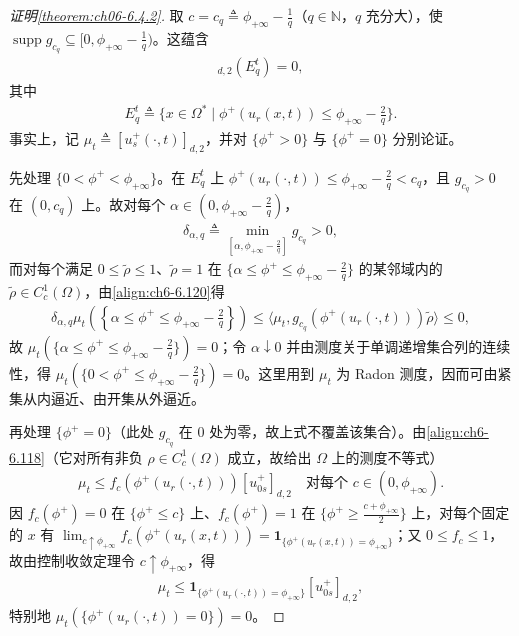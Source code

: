 \documentclass[../../main.tex]{subfiles}%
\begin{document}
\begin{proof}[证明\cref{theorem:ch06-6.4.2}]
取 $c=c_q\triangleq\phi_{+\infty}-\frac1q$（$q\in\mathbb{N}$，$q$ 充分大），使 $\operatorname{supp}g_{c_q}\subseteq[0,\phi_{+\infty}-\frac1q)$。这蕴含
\begin{align}
[u^+_s(\cdot,t)]_{d,2}(E^t_q)=0, \label{align:ch6-6.121}
\end{align}
其中
\begin{align*}
E^t_q\triangleq \{x\in\Omega^*\mid\phi^+(u_r(x,t))\leqslant\phi_{+\infty}-\frac{2}{q}\}.
\end{align*}
事实上，记 $\mu_t\triangleq[u^+_s(\cdot,t)]_{d,2}$，并对 $\{\phi^+>0\}$ 与 $\{\phi^+=0\}$ 分别论证。

先处理 $\{0<\phi^+<\phi_{+\infty}\}$。在 $E^t_q$ 上 $\phi^+(u_r(\cdot,t))\leqslant\phi_{+\infty}-\frac{2}{q}<c_q$，且 $g_{c_q}>0$ 在 $(0,c_q)$ 上。故对每个 $\alpha\in(0,\phi_{+\infty}-\frac{2}{q})$，
\begin{align*}
\delta_{\alpha,q}\triangleq\min_{[\alpha,\phi_{+\infty}-\frac{2}{q}]}g_{c_q}>0,
\end{align*}
而对每个满足 $0\leqslant\widetilde\rho\leqslant1$、$\widetilde\rho=1$ 在 $\{\alpha\leqslant\phi^+\leqslant\phi_{+\infty}-\frac{2}{q}\}$ 的某邻域内的 $\widetilde\rho\in C^1_c(\Omega)$，由\eqref{align:ch6-6.120}得
\begin{align*}
\delta_{\alpha,q}\mu_t\left(\left\{\alpha\leqslant\phi^+\leqslant\phi_{+\infty}-\tfrac{2}{q}\right\}\right)
\leqslant\langle\mu_t,g_{c_q}(\phi^+(u_r(\cdot,t)))\widetilde\rho\rangle\leqslant0,
\end{align*}
故 $\mu_t(\{\alpha\leqslant\phi^+\leqslant\phi_{+\infty}-\frac{2}{q}\})=0$；令 $\alpha\downarrow0$ 并由测度关于单调递增集合列的连续性，得 $\mu_t(\{0<\phi^+\leqslant\phi_{+\infty}-\frac{2}{q}\})=0$。这里用到 $\mu_t$ 为 Radon 测度，因而可由紧集从内逼近、由开集从外逼近。

再处理 $\{\phi^+=0\}$（此处 $g_{c_q}$ 在 $0$ 处为零，故上式不覆盖该集合）。由\eqref{align:ch6-6.118}（它对所有非负 $\rho\in C^1_c(\Omega)$ 成立，故给出 $\Omega$ 上的测度不等式）
\begin{align*}
\mu_t\leqslant f_c(\phi^+(u_r(\cdot,t)))[u^+_{0s}]_{d,2}\quad\text{对每个 }c\in(0,\phi_{+\infty}).
\end{align*}
因 $f_c(\phi^+)=0$ 在 $\{\phi^+\leqslant c\}$ 上、$f_c(\phi^+)=1$ 在 $\{\phi^+\geqslant\frac{c+\phi_{+\infty}}{2}\}$ 上，对每个固定的 $x$ 有 $\lim_{c\uparrow\phi_{+\infty}}f_c(\phi^+(u_r(x,t)))=\mathbf{1}_{\{\phi^+(u_r(x,t))=\phi_{+\infty}\}}$；又 $0\leqslant f_c\leqslant1$，故由控制收敛定理令 $c\uparrow\phi_{+\infty}$，得
\begin{align*}
\mu_t\leqslant\mathbf{1}_{\{\phi^+(u_r(\cdot,t))=\phi_{+\infty}\}}[u^+_{0s}]_{d,2},
\end{align*}
特别地 $\mu_t(\{\phi^+(u_r(\cdot,t))=0\})=0$。


\end{proof}
\end{document}
